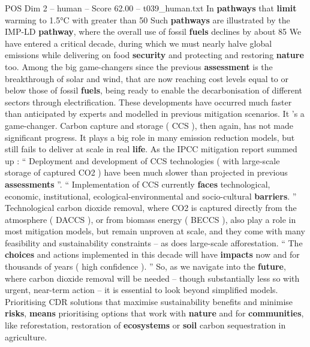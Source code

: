 \begin{textsample}{POS Dim 2 – human – Score 62.00 – t039\_human.txt}
In \textbf{pathways} that \textbf{limit} warming to 1.5°C with greater than 50 %
Such \textbf{pathways} are illustrated by the IMP-LD \textbf{pathway}, where the overall use of fossil \textbf{fuels} declines by about 85 %
We have entered a critical decade, during which we must nearly halve global emissions while delivering on food \textbf{security} and protecting and restoring \textbf{nature} too.
Among the big game-changers since the previous \textbf{assessment} is the breakthrough of solar and wind, that are now reaching cost levels equal to or below those of fossil \textbf{fuels}, being ready to enable the decarbonisation of different sectors through electrification.
These developments have occurred much faster than anticipated by experts and modelled in previous mitigation scenarios.
It ’s a game-changer.
Carbon capture and storage ( CCS ), then again, has not made significant progress.
It plays a big role in many emission reduction models, but still fails to deliver at scale in real \textbf{life}.
As the IPCC mitigation report summed up : “ Deployment and development of CCS technologies ( with large-scale storage of captured CO2 ) have been much slower than projected in previous \textbf{assessments} ”. “ Implementation of CCS currently \textbf{faces} technological, economic, institutional, ecological-environmental and socio-cultural \textbf{barriers}. ” Technological carbon dioxide removal, where CO2 is captured directly from the atmosphere ( DACCS ), or from biomass energy ( BECCS ), also play a role in most mitigation models, but remain unproven at scale, and they come with many feasibility and sustainability constraints – as does large-scale afforestation. “ The \textbf{choices} and actions implemented in this decade will have \textbf{impacts} now and for thousands of years ( high confidence ). ” So, as we navigate into the \textbf{future}, where carbon dioxide removal will be needed – though substantially less so with urgent, near-term action – it is essential to look beyond simplified models.
Prioritising CDR solutions that maximise sustainability benefits and minimise \textbf{risks}, \textbf{means} prioritising options that work with \textbf{nature} and for \textbf{communities}, like reforestation, restoration of \textbf{ecosystems} or \textbf{soil} carbon sequestration in agriculture.

\end{textsample}
